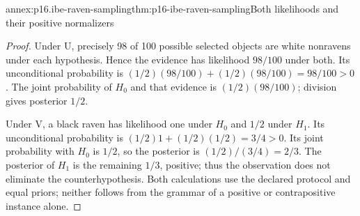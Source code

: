 \begin{annexitem}{annex:p16.ibe-raven-sampling}{thm:p16-ibe-raven-sampling}{Both likelihoods and their positive normalizers}
\begin{proof}
Under U, precisely 98 of 100 possible selected objects are white
nonravens under each hypothesis. Hence the evidence has likelihood
\(98/100\) under both. Its unconditional probability is
\((1/2)(98/100)+(1/2)(98/100)=98/100>0\). The joint probability
of \(H_0\) and that evidence is \((1/2)(98/100)\); division
gives posterior \(1/2\).

Under V, a black raven has likelihood one under \(H_0\) and
\(1/2\) under \(H_1\). Its unconditional probability is
\((1/2)1+(1/2)(1/2)=3/4>0\). Its joint probability with
\(H_0\) is \(1/2\), so the posterior is \((1/2)/(3/4)=2/3\).
The posterior of \(H_1\) is the remaining \(1/3\), positive;
thus the observation does not eliminate the counterhypothesis. Both
calculations use the declared protocol and equal priors; neither follows
from the grammar of a positive or contrapositive instance alone.
\end{proof}
\end{annexitem}

